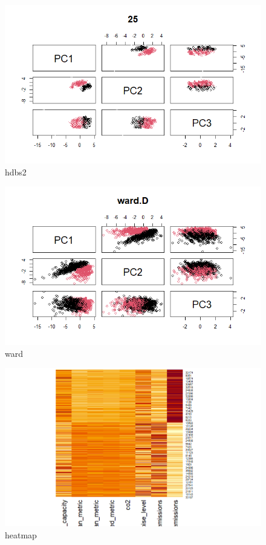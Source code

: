 \documentclass{article}
\begin{document}
\begin{figure}[h!]
        \centering
        \includegraphics[width=1.1\textwidth]{../plots/hdbs2.png}
        \caption{hdbs2}
        \label{fig:hdbs2}
\end{figure}

\begin{figure}[h!]
        \centering
        \includegraphics[width=1.1\textwidth]{../plots/ward.png}
        \caption{ward}
        \label{fig:ward}
\end{figure}    

\begin{figure}[h!]
        \centering
        \includegraphics[width=1.1\textwidth]{../plots/heatmap.png}
        \caption{heatmap}
        \label{fig:heatmap}
\end{figure}
\end{document}
